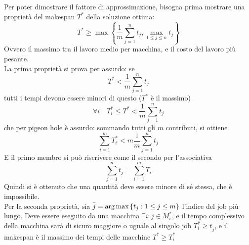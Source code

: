 Per poter dimostrare il fattore di approssimazione, bisogna prima mostrare una proprietà del makespan $T^*$ della soluzione ottima:
\begin{equation*}
    T^* \geq
    \max
    \left\{ 
        \frac{1}{m}
        \sum_{j=1}^{n} t_j
        ,
        \max_{1 \leq j \leq n} t_j
    \right\}
\end{equation*}
Ovvero il massimo tra il lavoro medio per macchina, e il costo del lavoro più pesante.
\\
La prima proprietà si prova per assurdo: se 
\begin{equation*}
    T^* <
    \frac{1}{m}
    \sum_{j=1}^{n} t_j
\end{equation*}
tutti i tempi devono essere minori di questo ($T^*$ è il massimo)
\begin{equation*}
    \forall i \quad
    T_{i}^{*} \leq
    T^* <
    \frac{1}{m}
    \sum_{j=1}^{n} t_j
\end{equation*}
che per pigeon hole è assurdo: sommando tutti gli $m$ contributi, si ottiene
\begin{equation*}
    \sum_{i=1}^{m}
    T_{i}^{*}
    <
    m
    \frac{1}{m}
    \sum_{j=1}^{n} t_j
\end{equation*}
E il primo membro si può riscrivere come il secondo per l'associativa
\begin{equation*}
    \sum_{j=1}^{n} t_j
    =
    \sum_{i=1}^{m} T_i
\end{equation*}
Quindi si è ottenuto che una quantità deve essere minore di sé stessa, che è impossibile.
\\
Per la seconda proprietà, sia
$
\bar{j} = \operatorname*{arg\,max} \left\{ t_j : 1 \leq j \leq m \right\}
$
l'indice del job più lungo. Deve essere eseguito da una macchina
$
\exists i : \bar{j} \in M_{i}^{*}
$, e il tempo complessivo della macchina sarà di sicuro maggiore o uguale al singolo job
$
T_{i}^{*}
\geq
t_{\bar{j}}
$, e il makespan è il massimo dei tempi delle macchine
$
T^* \geq
T_{i}^{*}
$


